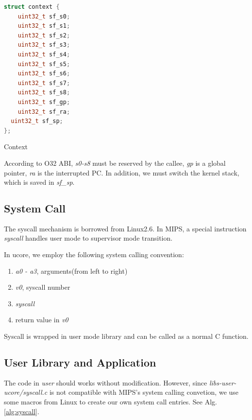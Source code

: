 \documentclass[a4paper]{article}
\begin{document}
\begin{algorithm}[H]
 \begin{lstlisting}[language={C++}]
struct context {
	uint32_t sf_s0;
	uint32_t sf_s1;
	uint32_t sf_s2;
	uint32_t sf_s3;
	uint32_t sf_s4;
	uint32_t sf_s5;
	uint32_t sf_s6;
	uint32_t sf_s7;
	uint32_t sf_s8;
	uint32_t sf_gp;
	uint32_t sf_ra;
  uint32_t sf_sp;
};

\end{lstlisting}
\caption{Context}
\label{alg:context}
\end{algorithm}

According to O32 ABI, \emph{s0-s8} must be reserved by the callee,
\emph{gp} is a global pointer, \emph{ra} is the interrupted PC.
In addition, we must switch the kernel stack, which is saved in \emph{sf\_sp}.


\subsection{System Call}
The syscall mechanism is borrowed from Linux2.6. In MIPS, a special 
instruction \emph{syscall} handles user mode to supervisor mode transition.

In ucore, we employ the following system calling convention:
\begin{enumerate}
  \item \emph{a0 - a3}, arguments(from left to right)
  \item \emph{v0}, syscall number
  \item \emph{syscall}
  \item return value in \emph{v0}
\end{enumerate}

Syscall is wrapped in user mode library and can be called as a normal 
C function. 

\subsection{User Library and Application}
The code in \emph{user}
should works without modification. However, since \emph{libs-user-ucore/syscall.c} is not compatible with MIPS's 
system calling convetion, we use some macros from Linux
to create our own system call entries. See Alg. \ref{alg:syscall}.
\end{document}
